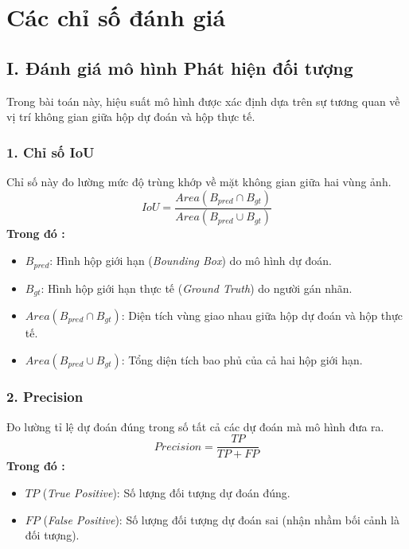 
\chapter{Các chỉ số đánh giá} %

\label{AppendixA} %

\section*{I. Đánh giá mô hình Phát hiện đối tượng}

Trong bài toán này, hiệu suất mô hình được xác định dựa trên sự tương quan về vị trí không gian giữa hộp dự đoán và hộp thực tế.

\subsection*{1. Chỉ số IoU}
Chỉ số này đo lường mức độ trùng khớp về mặt không gian giữa hai vùng ảnh.
\begin{equation}
IoU = \frac{Area(B_{pred} \cap B_{gt})}{Area(B_{pred} \cup B_{gt})}
\end{equation}
\textbf{Trong đó :}
\begin{itemize}
    \item $B_{pred}$: Hình hộp giới hạn (\textit{Bounding Box}) do mô hình dự đoán.
    \item $B_{gt}$: Hình hộp giới hạn thực tế (\textit{Ground Truth}) do người gán nhãn.
    \item $Area(B_{pred} \cap B_{gt})$: Diện tích vùng giao nhau giữa hộp dự đoán và hộp thực tế.
    \item $Area(B_{pred} \cup B_{gt})$: Tổng diện tích bao phủ của cả hai hộp giới hạn.
\end{itemize}

\subsection*{2. Precision}
Đo lường tỉ lệ dự đoán đúng trong số tất cả các dự đoán mà mô hình đưa ra.
\begin{equation}
Precision = \frac{TP}{TP + FP}
\end{equation}
\textbf{Trong đó :}
\begin{itemize}
    \item $TP$ (\textit{True Positive}): Số lượng đối tượng dự đoán đúng.
    \item $FP$ (\textit{False Positive}): Số lượng đối tượng dự đoán sai (nhận nhầm bối cảnh là đối tượng).
\end{itemize}

